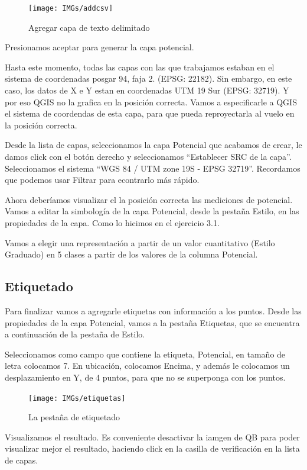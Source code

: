 \documentclass[onecolumn]{article}
\begin{document}
\begin{figure}[h]
	\centering
	\texttt{[image: IMGs/addcsv]}
	\caption{Agregar capa de texto delimitado}
	\label{fig:interfaz}
\end{figure}

Presionamos aceptar para generar la capa potencial. 

Hasta este momento, todas las capas con las que trabajamos estaban en el sistema de coordenadas posgar 94, faja 2. (EPSG: 22182). Sin embargo, en este caso, los datos de X e Y estan en coordenadas UTM 19 Sur (EPSG: 32719). Y por eso QGIS no la grafica en la posición correcta. Vamos a especificarle a QGIS el sistema de coordendas de esta capa, para que pueda reproyectarla al vuelo en la posición correcta. 

Desde la lista de capas, seleccionamos la capa Potencial que acabamos de crear, le damos click con el botón derecho y seleccionamos “Establecer SRC de la capa”. Seleccionamos el sistema “WGS 84 / UTM zone 19S - EPSG 32719”. Recordamos que podemos usar Filtrar para econtrarlo más rápido.

Ahora deberíamos visualizar el la posición correcta las mediciones de potencial. Vamos a editar la simbología de la capa Potencial, desde la pestaña Estilo, en las propiedades de la capa. Como lo hicimos en el ejercicio 3.1.

Vamos a elegir una representación a partir de un valor cuantitativo (Estilo Graduado) en 5 clases a partir de los valores de la columna Potencial. 


\subsection{Etiquetado}

Para finalizar vamos a agregarle etiquetas con información a los puntos. Desde las propiedades de la capa Potencial, vamos a la pestaña Etiquetas, que se encuentra a continuación de la pestaña de Estilo. 

Seleccionamos como campo que contiene la etiqueta, Potencial, en tamaño de letra colocamos 7. En ubicación, colocamos Encima, y además le colocamos un desplazamiento en Y, de 4 puntos, para que no se superponga con los puntos.

\begin{figure}[h]
	\centering
	\texttt{[image: IMGs/etiquetas]}
	\caption{La pestaña de etiquetado}
	\label{fig:interfaz}
\end{figure}

Visualizamos el resultado. Es conveniente desactivar la iamgen de QB para poder visualizar mejor el resultado, haciendo click en la casilla de verificación en la lista de capas.
\end{document}
